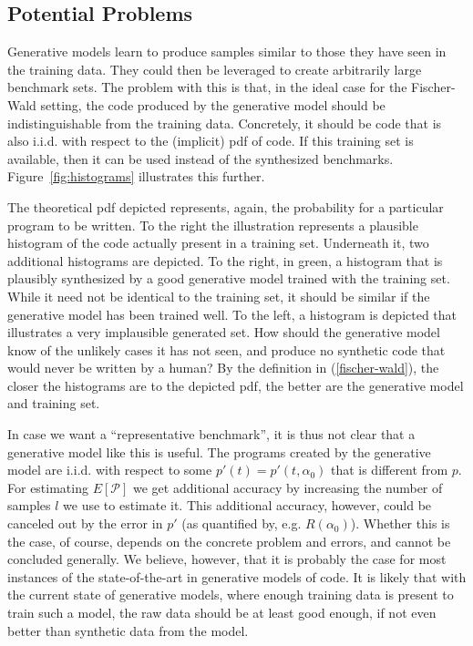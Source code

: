 \subsection{Potential Problems}
\label{sec:potential_problems}
Generative models learn to produce samples similar to those they have seen in the training data. They could then be leveraged to create arbitrarily large benchmark sets.
The problem with this is that, in the ideal case for the Fischer-Wald setting, the code produced by the generative model should be indistinguishable from the training data.
Concretely, it should be code that is also i.i.d. with respect to the (implicit) pdf of code.
If this training set is available, then it can be used instead of the synthesized benchmarks.
Figure~\ref{fig:histograms} illustrates this further.

The theoretical pdf depicted represents, again, the probability for a particular program to be written.
To the right the illustration represents a plausible histogram of the code actually present in a training set.
Underneath it, two additional histograms are depicted. To the right, in green, a histogram that is plausibly synthesized by a good generative model trained with the training set.
While it need not be identical to the training set, it should be similar if the generative model has been trained well.
To the left, a histogram is depicted that illustrates a very implausible generated set.
How should the generative model know of the unlikely cases it has not seen, and produce no synthetic code that would never be written by a human?
By the definition in (\ref{fischer-wald}), the closer the histograms are to the depicted pdf, the better are the generative model and training set.

In case we want a ``representative benchmark'', it is thus not clear that a generative model like this is useful.
The programs created by the generative model are i.i.d. with respect to some $p'(t) = p'(t,\alpha_0)$ that is different from $p$.
For estimating $E[\mathcal{P}]$ we get additional accuracy by increasing the number of samples $l$ we use to estimate it.
This additional accuracy, however, could be canceled out by the error in $p'$ (as quantified by, e.g. $R(\alpha_0)$).
Whether this is the case, of course, depends on the concrete problem and errors, and cannot be concluded generally.
We believe, however, that it is probably the case for most instances of the state-of-the-art in generative models of code.
It is likely that with the current state of generative models, where enough training data is present to train such a model, the raw data should be at least good enough, if not even better than synthetic data from the model.

